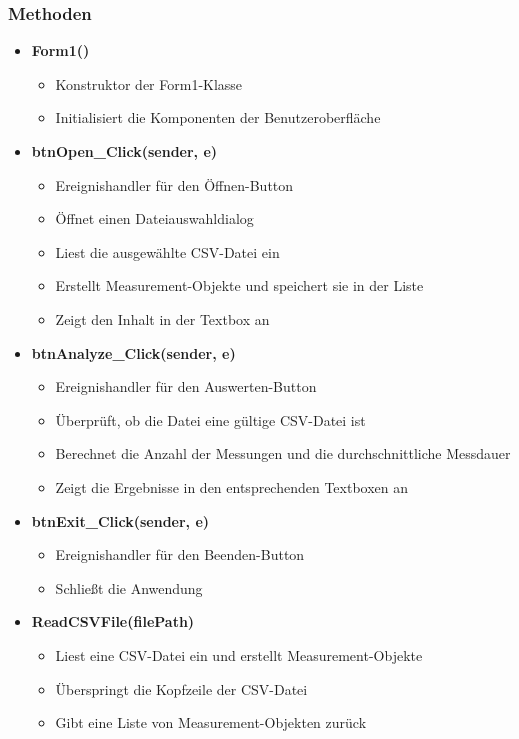 \documentclass[a4paper,11pt]{article}
\begin{document}
\subsubsection{Methoden}
\begin{itemize}
    \item \textbf{Form1()}
    \begin{itemize}
        \item Konstruktor der Form1-Klasse
        \item Initialisiert die Komponenten der Benutzeroberfläche
    \end{itemize}
    
    \item \textbf{btnOpen\_Click(sender, e)}
    \begin{itemize}
        \item Ereignishandler für den Öffnen-Button
        \item Öffnet einen Dateiauswahldialog
        \item Liest die ausgewählte CSV-Datei ein
        \item Erstellt Measurement-Objekte und speichert sie in der Liste
        \item Zeigt den Inhalt in der Textbox an
    \end{itemize}
    
    \item \textbf{btnAnalyze\_Click(sender, e)}
    \begin{itemize}
        \item Ereignishandler für den Auswerten-Button
        \item Überprüft, ob die Datei eine gültige CSV-Datei ist
        \item Berechnet die Anzahl der Messungen und die durchschnittliche Messdauer
        \item Zeigt die Ergebnisse in den entsprechenden Textboxen an
    \end{itemize}
    
    \item \textbf{btnExit\_Click(sender, e)}
    \begin{itemize}
        \item Ereignishandler für den Beenden-Button
        \item Schließt die Anwendung
    \end{itemize}
    
    \item \textbf{ReadCSVFile(filePath)}
    \begin{itemize}
        \item Liest eine CSV-Datei ein und erstellt Measurement-Objekte
        \item Überspringt die Kopfzeile der CSV-Datei
        \item Gibt eine Liste von Measurement-Objekten zurück
    \end{itemize}
    

\end{itemize}
\end{document}
